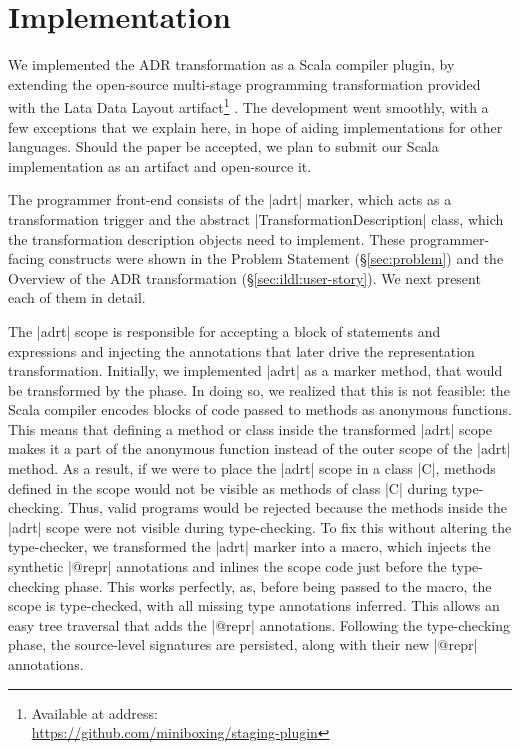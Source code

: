 \section{Implementation}
\label{sec:impl}

We implemented the ADR transformation as a Scala compiler plugin, by extending the open-source multi-stage programming transformation provided with the Lata Data Layout artifact\footnote{Available at address:\\ \url{https://github.com/miniboxing/staging-plugin}} \cite{ldl}. The development went smoothly, with a few exceptions that we explain here, in hope of aiding implementations for other languages. Should the paper be accepted, we plan to submit our Scala implementation as an artifact and open-source it.

The programmer front-end consists of the |adrt| marker, which acts as a transformation trigger and the abstract |TransformationDescription| class, which the transformation description objects need to implement. These programmer-facing constructs were shown in the Problem Statement (\S\ref{sec:problem}) and the Overview of the ADR transformation (\S\ref{sec:ildl:user-story}). We next present each of them in detail.

The |adrt| scope is responsible for accepting a block of statements
and expressions and injecting the annotations that later drive the
representation transformation. Initially, we implemented |adrt| as a
marker method, that would be transformed by the \inject{} phase. In
doing so, we realized that this is not feasible: the Scala compiler
encodes blocks of code passed to methods as anonymous functions. This
means that defining a method or class inside the transformed |adrt|
scope makes it a part of the anonymous function instead of the outer
scope of the |adrt| method. As a result, if we were to place the
|adrt| scope in a class |C|, methods defined in the scope would not be
visible as methods of class |C| during type-checking. Thus, valid
programs would be rejected because the methods inside the |adrt| scope
were not visible during type-checking. To fix this without altering
the type-checker, we transformed the |adrt| marker into a macro, which
injects the synthetic |@repr| annotations and inlines the scope code
just before the type-checking phase. This works perfectly, as, before
being passed to the macro, the scope is type-checked, with all missing
type annotations inferred. This allows an easy tree traversal that
adds the |@repr| annotations. Following the type-checking phase, the
source-level signatures are persisted, along with their new |@repr|
annotations.

